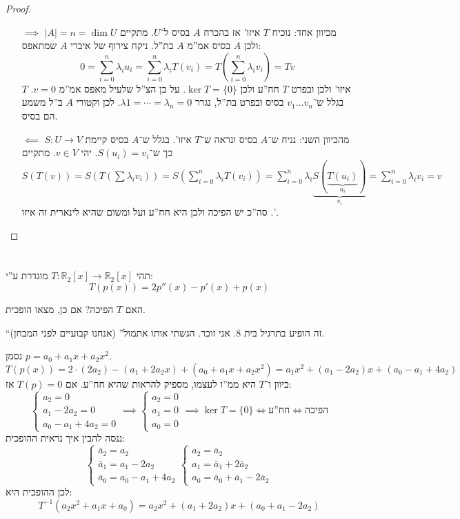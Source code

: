\documentclass[]{article}
\newcommand\R     {\mathbb{R}}
\newcommand\sumni     {\sum_{i = 0}^{n}}
\newcommand\co        {\colon}
\renewcommand\lg      {\lambda}
\newcommand\op    {^{-1}}
\newcommand\cl [1]    {\left ( #1 \right )}
\newcommand\dequad    {\!\!\!\!\!\!}
\theoremstyle{definition}
\begin{document}
	\begin{proof}
		\begin{itemize}
			\item[$\implies$]
			מכיוון אחד: נוכיח $T$ איזו' אז בהכרח $A$ בסיס ל־$U$. מתקיים $|A| = n = \dim U$ ולכן $A$ בסיס אמ''מ $A$ בת''ל. ניקח צירוף של איברי $A$ שמתאפס: 
			\[ 0 = \sumni \lg_i u_i = \sumni \lg_i T(v_i) = T\cl{\sumni \lg_i v_i} = Tv \]
			$T$ איזו' ולכן ובפרט $T$ חח''ע ולכן $\ker T = \{0\}$. על כן הצ''ל שלעיל מאפס אמ''מ $v = 0$. בגלל ש־$v_1 \dots v_n$ בסיס ובפרט בת''ל, נגרר $\lg1 = \cdots = \lg_n = 0$. לכן וקטורי $A$ ב''ל משמע הם בסיס. 
			
			\item[$\impliedby$]מהכיוון השני: נניח ש־$A$ בסיס ונראה ש־$T$ איזו'. בגלל ש־$A$ בסיס קיימת $S \co U \to V$ כך ש־$S(u_i) = v_i$. יהי $v \in V$. מתקיים $S(T(v)) = S(T(\sum \lg_i v_i)) = S(\sumni \lg_i T(v_i)) = \sumni \lg_i \underbrace{S(\underbrace{T(u_i)}_{u_i})}_{v_i} = \sumni \lg_i v_i = v$. סה''כ יש הפיכה ולכן היא חח''ע ועל ומשום שהיא לינארית זה איזו'. 
		\end{itemize}
	\end{proof}
	
	\section{}
	תהי $T \co \R_2[x] \to \R_2[x]$ מוגדרת ע''י: 
	\[ T(p(x)) = 2p''(x) - p'(x) + p(x) \]
	
	האם $T$ הפיכה? אם כן, מצאו הופכית. 
	
	``זה הופיע בתרגיל בית 8. אני זוכר. הגשתי אותו אתמול'' (אנחנו קבועיים לפני המבחן). 
	
	נסמן $p = a_0 + a_1x + a_2x^2$. 
	\[ T(p(x)) = 2 \cdot (2a_2) - (a_1 + 2a_2x) + (a_0 + a_1x + a_2x^2) = a_1x^2 + (a_1 - 2a_2)x + (a_0 - a_1 + 4a_2) \]
	כיוון ו־$T$ היא ממ''ו לעצמו, מספיק להראות שהיא חח''ע. אם $T(p) = 0$ אז: 
	\[ \begin{cases}
		a_2 = 0 \\
		a_1 - 2a_2 = 0 \\
		a_0 - a_1 + 4a_2 = 0
	\end{cases} \dequad \implies \begin{cases}
		a_2 = 0 \\ a_1 = 0 \\ a_0 = 0
	\end{cases} \dequad \implies \ker T = \{0\} \iff \text{חח''ע} \iff \text{הפיכה} \]
	ננסה להבין איך נראית ההופכית: 
	\[ \begin{cases}
		\bar a_2 = a_2 \\
		\bar a_1 = a_1 - 2a_2 \\
		\bar a_0 = a_0 - a_1 + 4a_2
	\end{cases}\dequad \begin{cases}
		a_2 = \bar a_2 \\
		a_1 = \bar a_1 +  2\bar a_2 \\
		a_0 = \bar a_0 + \bar a_1 - 2\bar a_2
	\end{cases} \]
	לכן ההופכית היא: 
	\[ T\op(a_2x^2 + a_1x + a_0) = a_2x^2 + (a_1 + 2a_2)x + (a_0 + a_1 - 2a_2) \]
	
\end{document}

